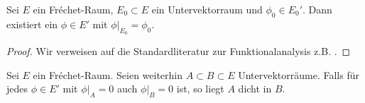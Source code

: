 \begin{thm}
  \label{thm:hahn-banach}
  Sei $E$ ein Fr\'echet-Raum, $E_0 \subset E$ ein Untervektorraum und
  $\phi_0 \in E_0'$. Dann existiert ein $\phi \in E'$ mit $\phi|_{E_0}
  = \phi_0$.
\end{thm}

\begin{proof}
  Wir verweisen auf die Standardliteratur zur Funktionalanalysis
  z.B. \cite[Satz 3.6]{Rud}.
\end{proof}

\begin{cor}
  \label{cor:frechet-dicht}
  Sei $E$ ein Fr\'echet-Raum. Seien weiterhin $A \subset B \subset E$
  Untervektorräume. Falls für jedes $\phi \in E'$ mit $\phi|_A =
  0$ auch $\phi|_B = 0$ ist, so liegt $A$ dicht in $B$.
\end{cor}

